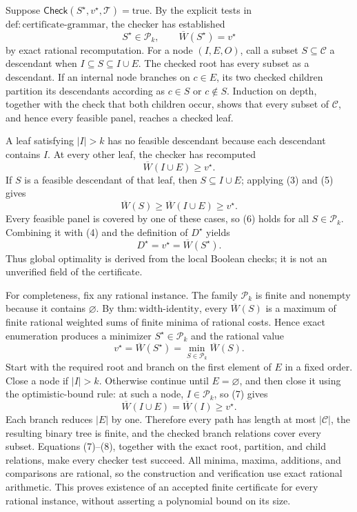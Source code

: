 Suppose \(\mathsf{Check}(S^\star,v^\star,\mathcal T)=\mathrm{true}\).
By the explicit tests in \(\mathrm{def{:}certificate\text{-}grammar}\),
the checker has established
\[
S^\star\in\mathcal P_k,
\qquad
\overline W(S^\star)=v^\star                                      \tag{4}
\]
by exact rational recomputation.  For a node \((I,E,O)\), call a subset
\(S\subseteq\mathcal C\) a descendant when
\(I\subseteq S\subseteq I\cup E\).  The checked root has every subset as a
descendant.  If an internal node branches on \(c\in E\), its two checked
children partition its descendants according as \(c\in S\) or
\(c\notin S\).  Induction on depth, together with the check that both
children occur, shows that every subset of \(\mathcal C\), and hence every
feasible panel, reaches a checked leaf.

A leaf satisfying \(|I|>k\) has no feasible descendant because each
descendant contains \(I\).  At every other leaf, the checker has recomputed
\[
\overline W(I\cup E)\geq v^\star.                                     \tag{5}
\]
If \(S\) is a feasible descendant of that leaf, then
\(S\subseteq I\cup E\); applying (3) and (5) gives
\[
\overline W(S)\geq\overline W(I\cup E)\geq v^\star.                   \tag{6}
\]
Every feasible panel is covered by one of these cases, so (6) holds for
all \(S\in\mathcal P_k\).  Combining it with (4) and the definition of
\(D^\star\) yields
\[
D^\star=v^\star=\overline W(S^\star).
\]
Thus global optimality is derived from the local Boolean checks; it is not
an unverified field of the certificate.

For completeness, fix any rational instance.  The family
\(\mathcal P_k\) is finite and nonempty because it contains
\(\varnothing\).  By \(\mathrm{thm{:}width\text{-}identity}\), every
\(\overline W(S)\) is a maximum of finite rational weighted sums of finite
minima of rational costs.  Hence exact enumeration produces a minimizer
\(S^\star\in\mathcal P_k\) and the rational value
\[
v^\star=\overline W(S^\star)=\min_{S\in\mathcal P_k}\overline W(S).   \tag{7}
\]
Start with the required root and branch on the first element of \(E\) in a
fixed order.  Close a node if \(|I|>k\).  Otherwise continue until
\(E=\varnothing\), and then close it using the optimistic-bound rule: at
such a node, \(I\in\mathcal P_k\), so (7) gives
\[
\overline W(I\cup E)=\overline W(I)\geq v^\star.                      \tag{8}
\]
Each branch reduces \(|E|\) by one.  Therefore every path has length at
most \(|\mathcal C|\), the resulting binary tree is finite, and the checked
branch relations cover every subset.  Equations (7)--(8), together with
the exact root, partition, and child relations, make every checker test
succeed.  All minima, maxima, additions, and comparisons are rational, so
the construction and verification use exact rational arithmetic.  This
proves existence of an accepted finite certificate for every rational
instance, without asserting a polynomial bound on its size.

